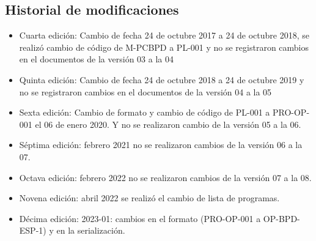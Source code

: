 \subsection{Historial de modificaciones}

\begin{itemize}
	\item Cuarta edición: Cambio de fecha 24 de octubre 2017 a 24 de octubre 2018, se realizó cambio de código de M-PCBPD a PL-001 y no se registraron cambios en el documentos de la versión 03 a la 04
	\item Quinta edición: Cambio de fecha 24 de octubre 2018 a 24 de octubre 2019 y no se registraron cambios en el documentos de la versión 04 a la 05
	\item Sexta edición: Cambio de formato y cambio de código de PL-001 a PRO-OP-001 el 06 de enero 2020. Y no se realizaron cambio de la versión 05 a la 06.
	\item Séptima edición: febrero 2021 no se realizaron cambios de la versión 06 a la 07.
	\item Octava edición: febrero 2022 no se realizaron cambios de la versión 07 a la 08.
	\item Novena edición: abril 2022 se realizó el cambio de lista de programas.
	\item Décima edición: 2023-01: cambios en el formato (PRO-OP-001 a OP-BPD-ESP-1) y en la serialización.
\end{itemize}
